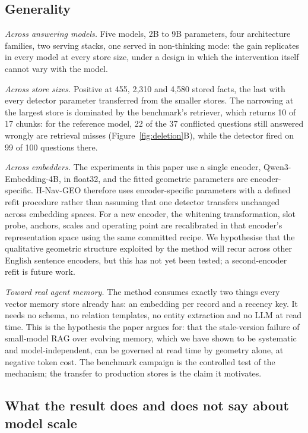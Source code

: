 \documentclass[journal=jcisd8,manuscript=article]{achemso}
\begin{document}
\subsection{Generality}

\emph{Across answering models.} Five models, 2B to 9B parameters, four architecture families, two serving stacks, one served in non-thinking mode: the gain replicates in every model at every store size, under a design in which the intervention itself cannot vary with the model.

\emph{Across store sizes.} Positive at 455, 2,310 and 4,580 stored facts, the last with every detector parameter transferred from the smaller stores. The narrowing at the largest store is dominated by the benchmark's retriever, which returns 10 of 17 chunks: for the reference model, 22 of the 37 conflicted questions still answered wrongly are retrieval misses (Figure~\ref{fig:deletion}B), while the detector fired on 99 of 100 questions there.

\emph{Across embedders.} The experiments in this paper use a single encoder, Qwen3-Embedding-4B, in float32, and the fitted geometric parameters are encoder-specific. H-Nav-GEO therefore uses encoder-specific parameters with a defined refit procedure rather than assuming that one detector transfers unchanged across embedding spaces. For a new encoder, the whitening transformation, slot probe, anchors, scales and operating point are recalibrated in that encoder's representation space using the same committed recipe. We hypothesise that the qualitative geometric structure exploited by the method will recur across other English sentence encoders, but this has not yet been tested; a second-encoder refit is future work.

\emph{Toward real agent memory.} The method consumes exactly two things every vector memory store already has: an embedding per record and a recency key. It needs no schema, no relation templates, no entity extraction and no LLM at read time. This is the hypothesis the paper argues for: that the stale-version failure of small-model RAG over evolving memory, which we have shown to be systematic and model-independent, can be governed at read time by geometry alone, at negative token cost. The benchmark campaign is the controlled test of the mechanism; the transfer to production stores is the claim it motivates.

\subsection{What the result does and does not say about model scale}\label{sec:scale-discussion}
\end{document}

